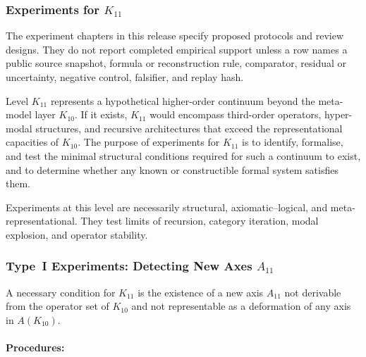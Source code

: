 
\subsubsection{Experiments for $K_{11}$}

The experiment chapters in this release specify proposed protocols and review designs. They do not report completed empirical support unless a row names a public source snapshot, formula or reconstruction rule, comparator, residual or uncertainty, negative control, falsifier, and replay hash.
\label{sec:experiments-k11}

Level $K_{11}$ represents a hypothetical higher-order continuum
beyond the meta-model layer $K_{10}$.
If it exists, $K_{11}$ would encompass third-order operators,
hyper-modal structures, and recursive architectures that exceed the
representational capacities of $K_{10}$.
The purpose of experiments for $K_{11}$ is to identify, formalise,
and test the minimal structural conditions required for such a
continuum to exist, and to determine whether any known or constructible
formal system satisfies them.

Experiments at this level are necessarily structural,
axiomatic–logical, and meta-representational.
They test limits of recursion, category iteration, modal explosion,
and operator stability.



\subsubsection{Type~I Experiments: Detecting New Axes $A_{11}$}

A necessary condition for $K_{11}$ is the existence of a new axis
$A_{11}$ not derivable from the operator set of $K_{10}$ and not
representable as a deformation of any axis in $A(K_{10})$.

\paragraph{Procedures:}

